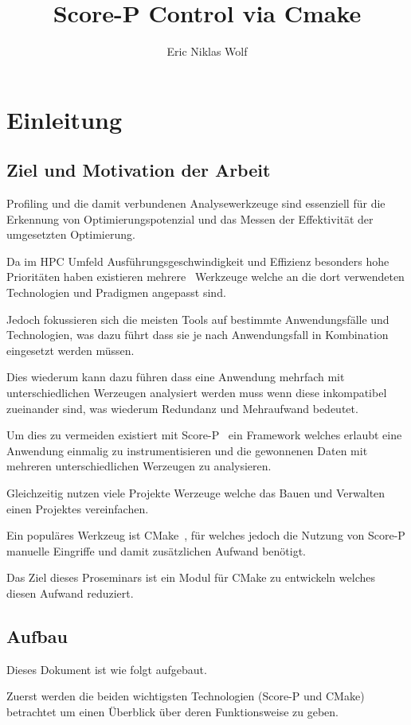 \documentclass[german,proseminar,hyperref,utf8]{zihpub}
\author{Eric Niklas Wolf}
\title{Score-P Control via Cmake}
\begin{document}
    \section{Einleitung}
    \subsection{Ziel und Motivation der Arbeit}
    Profiling und die damit verbundenen Analysewerkzeuge sind essenziell für die Erkennung von
    Optimierungspotenzial und das Messen der Effektivität der umgesetzten Optimierung.

    Da im HPC Umfeld Ausführungsgeschwindigkeit und Effizienz besonders hohe Prioritäten haben existieren
    mehrere~ Werkzeuge welche an die dort verwendeten Technologien
    und Pradigmen angepasst sind.

    Jedoch fokussieren sich die meisten Tools auf bestimmte Anwendungsfälle und Technologien,
    was dazu führt dass sie je nach Anwendungsfall in Kombination eingesetzt werden müssen.

    Dies wiederum kann dazu führen dass eine Anwendung mehrfach mit unterschiedlichen Werzeugen
    analysiert werden muss wenn diese inkompatibel zueinander sind, was wiederum Redundanz
    und Mehraufwand bedeutet.

    Um dies zu vermeiden existiert mit Score-P~\cite{Score-P-Paper} ein Framework welches erlaubt
    eine Anwendung  einmalig zu instrumentisieren und die gewonnenen Daten mit mehreren
    unterschiedlichen Werzeugen zu analysieren.

    Gleichzeitig nutzen viele Projekte Werzeuge welche das Bauen und Verwalten einen Projektes
    vereinfachen.

    Ein populäres Werkzeug ist CMake~\cite{CMake-Documentation}, für welches jedoch die Nutzung
    von Score-P manuelle Eingriffe und damit zusätzlichen Aufwand benötigt.

    Das Ziel dieses Proseminars ist ein Modul für CMake zu entwickeln welches diesen Aufwand
    reduziert.


    \subsection{Aufbau}
    Dieses Dokument ist wie folgt aufgebaut.

    Zuerst werden die beiden wichtigsten Technologien (Score-P und CMake) betrachtet um einen
    Überblick über deren Funktionsweise zu geben.
\end{document}
